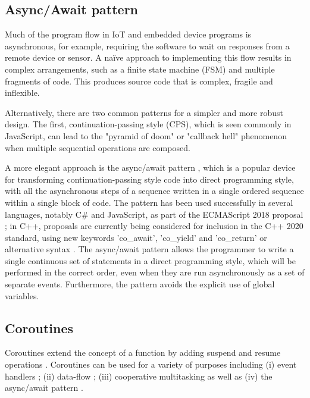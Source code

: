\subsection{Async/Await pattern}

Much of the program flow in IoT and embedded device programs is asynchronous, for example, requiring the software to wait on responses from a remote device or sensor. A naïve approach to implementing this flow results in complex arrangements, such as a finite state machine (FSM) and multiple fragments of code. This produces source code that is complex, fragile and inflexible.

Alternatively, there are two common patterns for a simpler and more robust design. The first, continuation-passing style (CPS), which is seen commonly in JavaScript, can lead to the "pyramid of doom" or "callback hell" phenomenon \cite{Brodu2015, Edwards2009, Madsen2017, Kambona2013} when multiple sequential operations are composed.

A more elegant approach is the async/await pattern \cite{Bierman2012, Haller2016, Okur2014, Syme2011}, which is a popular device for transforming continuation-passing style code into direct programming style, with all the asynchronous steps of a sequence written in a single ordered sequence within a single block of code. The pattern has been used successfully in several languages, notably C\# \cite{Bierman2012, Okur2014} and JavaScript, as part of the ECMAScript 2018 proposal \cite{ECMA2017}; in C++, proposals are currently being considered for inclusion in the C++ 2020 standard, using new keywords 'co\_await', 'co\_yield' and 'co\_return' or alternative syntax \cite{ISO2017, Romer2018}. The async/await pattern allows the programmer to write a single continuous set of statements in a direct programming style, which will be performed in the correct order, even when they are run asynchronously as a set of separate events. Furthermore, the pattern avoids the explicit use of global variables.

\subsection{Coroutines}

Coroutines extend the concept of a function by adding suspend and resume operations \cite{Conway1963, Knuth1968, Marlin1979}. Coroutines can be used for a variety of purposes including (i) event handlers \cite{Dunkels2006}; (ii) data-flow \cite{Kugler2013}; (iii) cooperative multitasking \cite{Susilo2009} as well as (iv) the async/await pattern \cite{ISO2017}.

